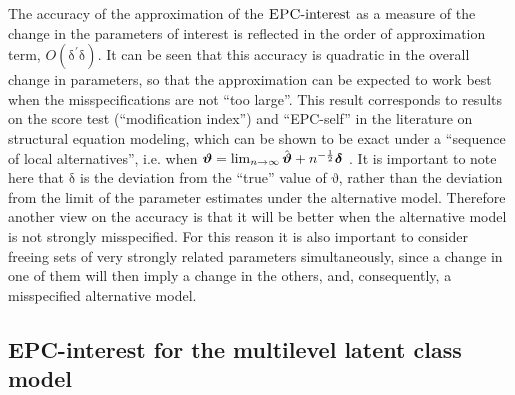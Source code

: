 \documentclass[letterpaper,12pt]{article}
\newcommand\vm[1]{%
\bm{\mathrm{#1}}}
\newcommand{\param}{\vm{\theta}}
\newcommand{\bpsi}{\vm{\psi}}
\newcommand{\da}{\textrm{{\sc {EPC}}-interest}}
\begin{document}
The accuracy of the approximation of the $\da{}$ as a measure of the change in the parameters of interest is reflected in the order of approximation term, $O(\vm{\delta}^\prime\vm{\delta})$. It can be seen that this accuracy is quadratic in the overall change in parameters, so that the approximation can be expected to work best when the misspecifications are not ``too large''. This result corresponds to results on the score test (``modification index'') and ``EPC-self'' in the literature on structural equation modeling, which can be shown to be exact under a ``sequence of local alternatives'', i.e. when $\vm{\vartheta} = \lim_{n\rightarrow\infty} \hat{\vm{\vartheta}} + n^{-\frac{1}{2}}\vm{\delta}$ \citep[p. 135]{satorra1989alternative}.
It is important to note here that $\vm{\delta}$ is the deviation from the ``true'' value of $\vm{\vartheta}$, rather than the deviation from the limit of the parameter estimates under the alternative model. Therefore another view on the accuracy is that it will be better when the alternative model is not strongly misspecified. For this reason it is also important to consider freeing sets of very strongly related parameters simultaneously, since a change in one of them will then imply a change in the others, and, consequently, a misspecified alternative model.


\subsection{EPC-interest for the multilevel latent class model}
\end{document}
